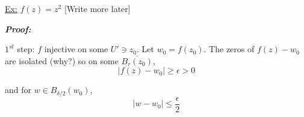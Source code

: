 \documentclass{article}
\begin{document}
\vskip 0.5cm
\underline{Ex:} $f(z) = z^2$ [Write more later]

\vskip 0.5cm
\emph{\textbf{Proof:}} 


$1^{st}$ step: $f$ injective on some $U' \ni z_0$. Let $w_0 = f(z_0)$. The zeros of $f(z) - w_0$ are isolated (why?) so on some $\overline{B_r(z_0)}$, 
\[ \left| f(z) - w_0 \right| \geq \epsilon > 0 \]

and for $w \in B_{\delta/2}(w_0)$, 
\[ \left| w - w_0 \right| \leq \frac{\epsilon}{2} \]
\end{document}
